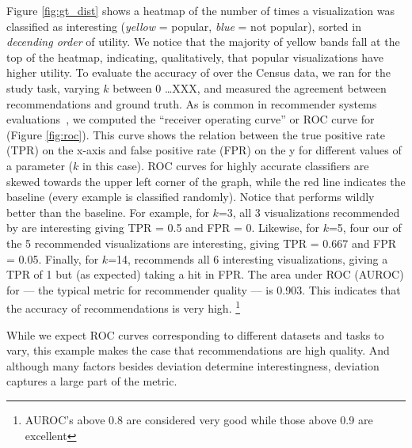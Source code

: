 Figure \ref{fig:gt_dist} shows a heatmap of the number of times a
visualization was classified as interesting 
({\em yellow} = popular, {\em blue} = not popular), sorted
in {\em decending order} of utility. 
We notice that the majority of yellow bands fall at the top of the
heatmap, indicating, qualitatively, that popular visualizations have higher utility.
To evaluate the accuracy of \SeeDB over the Census data, 
we ran \SeeDB for the study task, varying $k$ between 0 \ldots XXX, and measured
the agreement between \SeeDB recommendations and ground truth.
As is common in recommender systems evaluations~\cite{rec_sys}, 
we computed the ``receiver operating curve'' or ROC curve for \SeeDB 
(Figure \ref{fig:roc}).
This curve shows the relation between the true positive rate (TPR) on the 
x-axis and false positive rate (FPR) on the y for different values of a
parameter ($k$ in this case).
ROC curves for highly accurate classifiers are skewed towards the upper left
corner of the graph, while the red line indicates the baseline (every example
is classified randomly).
Notice that \SeeDB performs wildly better than the baseline.
For example, for $k$=3, all 3 visualizations recommended by \SeeDB are interesting
giving TPR = 0.5 and FPR = 0.
Likewise, for $k$=5, four our of the 5 recommended visualizations are interesting, 
giving TPR = 0.667 and FPR = 0.05.
Finally, for $k$=14, \SeeDB recommends all 6 interesting visualizations, giving a 
TPR of 1 but (as expected) taking a hit in FPR.
The area under ROC (AUROC) for \SeeDB --- the typical metric for recommender quality ---
is 0.903.
This indicates that the accuracy of \SeeDB recommendations is very high.
\footnote{AUROC's above 0.8 are considered very good while those above 0.9 are
excellent}

While we expect ROC curves corresponding to different datasets and tasks to vary,
this example makes the case that \SeeDB recommendations are high quality.
And although many factors besides deviation determine interestingness, deviation 
captures a large part of the metric.


